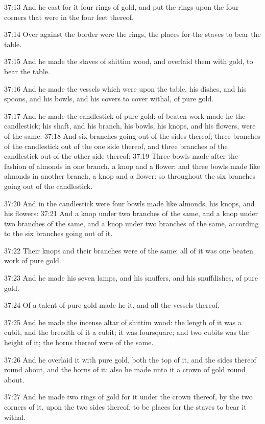 37:13 And he cast for it four rings of gold, and put the rings upon the four corners that were in the four feet thereof.

37:14 Over against the border were the rings, the places for the staves to bear the table.

37:15 And he made the staves of shittim wood, and overlaid them with gold, to bear the table.

37:16 And he made the vessels which were upon the table, his dishes, and his spoons, and his bowls, and his covers to cover withal, of pure gold.

37:17 And he made the candlestick of pure gold: of beaten work made he the candlestick; his shaft, and his branch, his bowls, his knops, and his flowers, were of the same: 37:18 And six branches going out of the sides thereof; three branches of the candlestick out of the one side thereof, and three branches of the candlestick out of the other side thereof: 37:19 Three bowls made after the fashion of almonds in one branch, a knop and a flower; and three bowls made like almonds in another branch, a knop and a flower: so throughout the six branches going out of the candlestick.

37:20 And in the candlestick were four bowls made like almonds, his knops, and his flowers: 37:21 And a knop under two branches of the same, and a knop under two branches of the same, and a knop under two branches of the same, according to the six branches going out of it.

37:22 Their knops and their branches were of the same: all of it was one beaten work of pure gold.

37:23 And he made his seven lamps, and his snuffers, and his snuffdishes, of pure gold.

37:24 Of a talent of pure gold made he it, and all the vessels thereof.

37:25 And he made the incense altar of shittim wood: the length of it was a cubit, and the breadth of it a cubit; it was foursquare; and two cubits was the height of it; the horns thereof were of the same.

37:26 And he overlaid it with pure gold, both the top of it, and the sides thereof round about, and the horns of it: also he made unto it a crown of gold round about.

37:27 And he made two rings of gold for it under the crown thereof, by the two corners of it, upon the two sides thereof, to be places for the staves to bear it withal.

